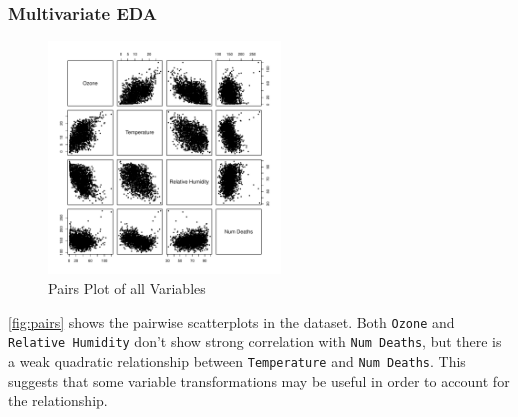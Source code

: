 \documentclass{article}\usepackage[]{graphicx}\usepackage[]{color}
\newenvironment{knitrout}{}{} %
\begin{document}
\subsubsection{Multivariate EDA}
\vspace{-20 pt}

\begin{knitrout}
\color{fgcolor}\begin{figure}[H]

{\centering \includegraphics[width=0.55\textwidth]{figure/pairs-1} 

}

\caption[Pairs Plot of all Variables]{Pairs Plot of all Variables}\label{fig:pairs}
\end{figure}


\end{knitrout}

\autoref{fig:pairs} shows the pairwise scatterplots in the dataset. Both \texttt{Ozone} and \texttt{Relative Humidity} don't show strong correlation with \texttt{Num Deaths}, but there is a weak quadratic relationship between \texttt{Temperature} and \texttt{Num Deaths}. This suggests that some variable transformations may be useful in order to account for the relationship. 
\end{document}
